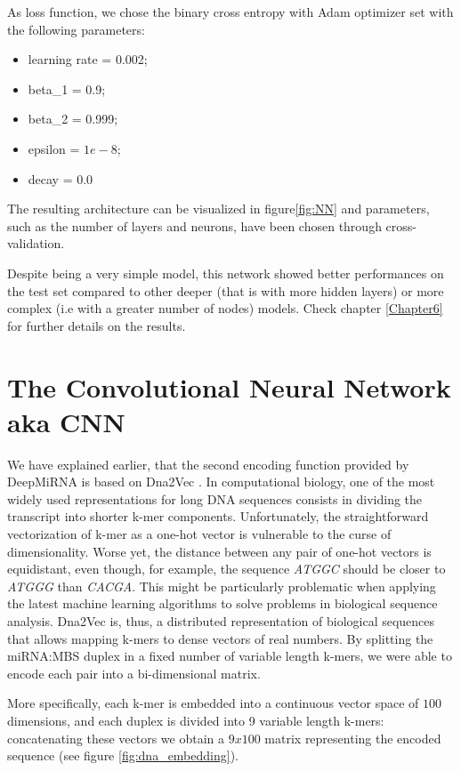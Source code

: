 As loss function, we chose the binary cross entropy with Adam optimizer set with the following parameters:

\begin{itemize}
	\item learning rate = 0.002;
	\item beta\_1 = 0.9;
	\item beta\_2 = 0.999;
	\item epsilon = $1e-8$;
	\item decay = 0.0
\end{itemize}

The resulting architecture can be visualized in figure\ref{fig:NN} and parameters, such as the number of layers and neurons, have been chosen through cross-validation.

Despite being a very simple model, this network showed better performances on the test set compared to other deeper (that is with more hidden layers) or more complex (i.e with a greater number of nodes) models. Check chapter \ref{Chapter6} for further details on the results.

\section{The Convolutional Neural Network aka CNN}
We have explained earlier, that the second encoding function provided by DeepMiRNA is based on Dna2Vec \cite{dna_distributed_repr}. In computational biology, one of the most widely used representations for long DNA sequences consists in dividing the transcript into shorter k-mer components.  Unfortunately, the straightforward vectorization of k-mer as a one-hot vector is vulnerable to the curse of dimensionality. Worse yet, the distance between any pair of one-hot vectors is equidistant, even though, for example, the sequence \emph{ATGGC} should be closer to \emph{ATGGG} than \emph{CACGA}. This might be particularly problematic when applying the latest machine learning algorithms to solve problems in biological sequence analysis. Dna2Vec is, thus, a distributed representation of biological sequences that allows mapping k-mers to dense vectors of real numbers. By splitting the miRNA:MBS duplex in a fixed number of variable length k-mers, we were able to encode each pair into a bi-dimensional matrix. 

More specifically, each k-mer is embedded into a continuous vector space of $100$ dimensions, and each duplex is divided into 9 variable length k-mers: concatenating these vectors we obtain a $9x100$ matrix representing the encoded sequence (see figure \ref{fig:dna_embedding}).

